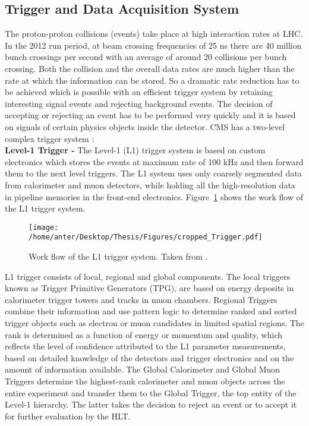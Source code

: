 \subsection{Trigger and Data Acquisition System}
The proton-proton collisions (events) take place at high interaction rates at LHC. In the 2012 run period, at beam crossing frequencies of 25 ns there are 40 million bunch crossings per second with an average of around 20 collisions per bunch crossing. Both the collision and the overall data rates are much higher than the rate at which the information can be stored. So a dramatic rate reduction has to be achieved which is possible with an efficient trigger system by retaining interesting signal events and rejecting background events. The decision of accepting or rejecting an event has to be performed very quickly and it is based on signals of certain physics objects inside the detector.
CMS has a two-level complex trigger system : \\\newline
{\bf Level-1 Trigger -} The Level-1 (L1) trigger system is based on custom electronics which stores the events at maximum rate of 100 kHz and then forward them to the next level triggers. The L1 system uses only coarsely segmented data from calorimeter and muon detectors, while holding all the high-resolution data in pipeline memories in the front-end electronics. Figure~\ref{fig:L1} shows the work flow of the L1 trigger system. 
\begin{figure}[!h]
\begin{center}
\vspace*{3mm} 
\hspace*{-5mm}
\texttt{[image: /home/anter/Desktop/Thesis/Figures/cropped\_Trigger.pdf]}\\
\vspace*{4mm}
\caption[Work flow of the L1 trigger system]{Work flow of the L1 trigger system. Taken from \cite{Chatrchyan:2008aa}.}
\label{fig:L1}
\end{center}
\end{figure}
L1 trigger consists of local, regional and global components. The local triggers known as Trigger Primitive Generators (TPG), are based on energy deposits in calorimeter trigger towers and tracks in muon chambers. Regional Triggers combine their information and use pattern logic to determine ranked and sorted trigger objects such as electron or muon candidates in limited spatial regions. The rank is determined as a function of energy or momentum and quality, which reflects the level of confidence attributed to the L1 parameter measurements, based on detailed knowledge of the detectors and trigger electronics and on the amount of information available. The Global Calorimeter and Global Muon Triggers determine the highest-rank calorimeter and muon objects across the entire experiment and transfer them to the Global Trigger, the top entity of the Level-1 hierarchy. The latter takes the decision to reject an event or to accept it for further evaluation by the HLT. \\\newline
